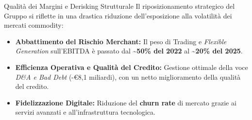 \begin{frame}{Qualità dei Margini e Derisking Strutturale}
    Il riposizionamento strategico del Gruppo si riflette in una drastica riduzione dell'esposizione alla volatilità dei mercati commodity:
    \vspace{0.2cm}

    \begin{itemize}
        \item \textbf{Abbattimento del Rischio Merchant:} Il peso di Trading e \textit{Flexible Generation} sull'EBITDA è passato dal \textbf{\textasciitilde 50\% del 2022} al \textbf{\textasciitilde 20\% del 2025}.
        \pause
        
        \item \textbf{Efficienza Operativa e Qualità del Credito:} Gestione ottimale della voce \textit{D\&A e Bad Debt} (-€8,1 miliardi), con un netto miglioramento della qualità del credito.
        \pause
        
        \item \textbf{Fidelizzazione Digitale:} Riduzione del \textbf{churn rate} di mercato grazie ai servizi avanzati e all'infrastruttura tecnologica.
    \end{itemize}
\end{frame}
